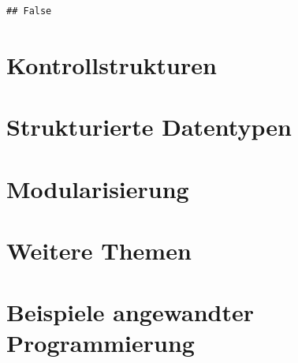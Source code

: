 \documentclass[
]{book}
\begin{document}
\begin{verbatim}
## False
\end{verbatim}

\hypertarget{kontrollstrukturen}{%
\chapter{Kontrollstrukturen}\label{kontrollstrukturen}}

\hypertarget{strukturierte-datentypen}{%
\chapter{Strukturierte Datentypen}\label{strukturierte-datentypen}}

\hypertarget{modularisierung}{%
\chapter{Modularisierung}\label{modularisierung}}

\hypertarget{weitere-themen}{%
\chapter{Weitere Themen}\label{weitere-themen}}

\hypertarget{beispiele-angewandter-programmierung}{%
\chapter{Beispiele angewandter Programmierung}\label{beispiele-angewandter-programmierung}}

  
\end{document}
